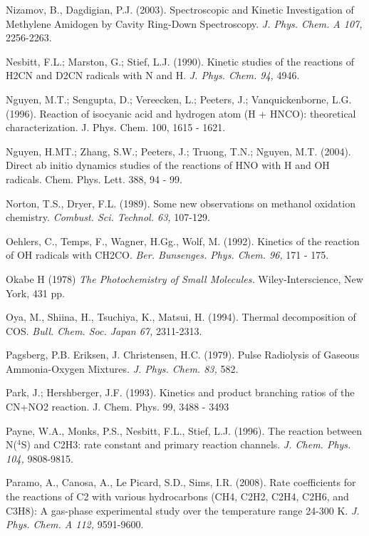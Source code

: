 \documentclass[12pt,landscape]{article}
\newcounter{reaction}
\begin{document}
Nizamov, B., Dagdigian, P.J. (2003).  Spectroscopic and Kinetic Investigation of Methylene Amidogen by Cavity Ring-Down Spectroscopy. {\em J. Phys. Chem. A 107,} 2256-2263.

Nesbitt, F.L.; Marston, G.; Stief, L.J. (1990). Kinetic studies of the reactions of H2CN and D2CN radicals with N and H.  {\em J. Phys. Chem. 94,} 4946.

Nguyen, M.T.; Sengupta, D.; Vereecken, L.; Peeters, J.; Vanquickenborne, L.G. (1996).
 Reaction of isocyanic acid and hydrogen atom (H + HNCO): theoretical characterization.  J. Phys. Chem. 100, 1615 - 1621.

Nguyen, H.MT.; Zhang, S.W.; Peeters, J.; Truong, T.N.; Nguyen, M.T. (2004).  Direct ab initio dynamics studies of the reactions of HNO with H and OH radicals.  Chem. Phys. Lett.   388, 94 - 99.

Norton, T.S., Dryer, F.L. (1989). Some new observations on methanol oxidation chemistry.  {\em Combust. Sci. Technol.  63,} 107-129.

Oehlers, C., Temps, F., Wagner, H.Gg., Wolf, M. (1992). Kinetics of the reaction of OH radicals with CH2CO. {\em Ber. Bunsenges. Phys. Chem. 96,} 171 - 175.

Okabe H (1978) {\em The Photochemistry of Small Molecules.} Wiley-Interscience, New York, 431 pp.

Oya, M., Shiina, H., Tsuchiya, K., Matsui, H. (1994). Thermal decomposition of COS. {\em Bull. Chem. Soc. Japan 67,} 2311-2313.

Pagsberg, P.B. Eriksen, J. Christensen, H.C. (1979).  Pulse Radiolysis of Gaseous Ammonia-Oxygen Mixtures.  {\em J. Phys. Chem. 83,} 582.

Park, J.; Hershberger, J.F. (1993).  Kinetics and product branching ratios of the CN+NO2 reaction. J. Chem. Phys.  99,  3488 - 3493

Payne, W.A., Monks, P.S., Nesbitt, F.L., Stief, L.J. (1996). The reaction between N($^4$S) and C2H3: rate constant and primary reaction channels.  {\em J. Chem. Phys. 104,} 9808-9815.

Paramo, A., Canosa, A., Le Picard, S.D., Sims, I.R. (2008). Rate coefficients for the reactions of C2 with various hydrocarbons (CH4, C2H2, C2H4, C2H6, and C3H8): A gas-phase experimental study over the temperature range 24-300 K.  {\em J. Phys. Chem. A 112, } 9591-9600.
\end{document}
